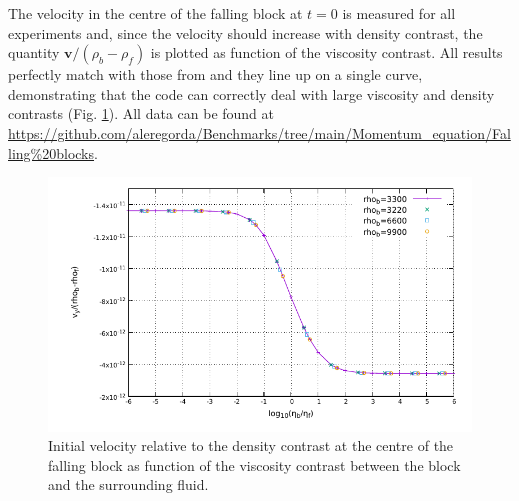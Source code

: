 The velocity in the centre of the falling block at $t=0$ is measured for all experiments and, since the velocity should increase with density contrast, the
quantity $\bm{v}/(\rho_b-\rho_f)$ is plotted as function of the viscosity contrast. All results perfectly match with those from \citet{Gerya2010} and they
line up on a single curve, demonstrating that the code can correctly deal with large viscosity and density contrasts (Fig. \ref{fig:falling}). All data can be 
found at \url{https://github.com/aleregorda/Benchmarks/tree/main/Momentum_equation/Falling%20blocks}.
\begin{figure}[h!]
\centering
\includegraphics[width=13cm]{./Figures/Falling.pdf}
\caption{Initial velocity relative to the density contrast at the centre of the falling block as function of the viscosity contrast between the block and the
surrounding fluid.}
\label{fig:falling}
\end{figure}